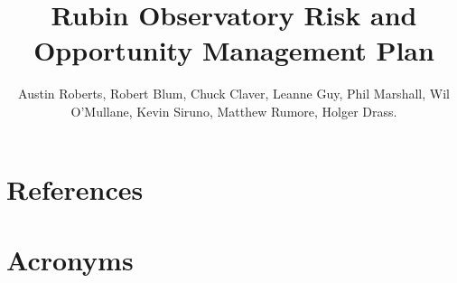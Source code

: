 \documentclass[OPS,toc,lsstdraft,authoryear]{lsstdoc}
\title{Rubin Observatory Risk and Opportunity Management Plan}
\author{%
Austin Roberts,
Robert Blum,
Chuck Claver,
Leanne Guy,
Phil Marshall,
Wil O'Mullane,
Kevin Siruno,
Matthew Rumore,
Holger Drass.
}
\date{\vcsDate}
\begin{document}














\newpage

\appendix

\section{References} \label{sec:bib}
\renewcommand{\refname}{} %


\section{Acronyms} \label{sec:acronyms}

\end{document}
